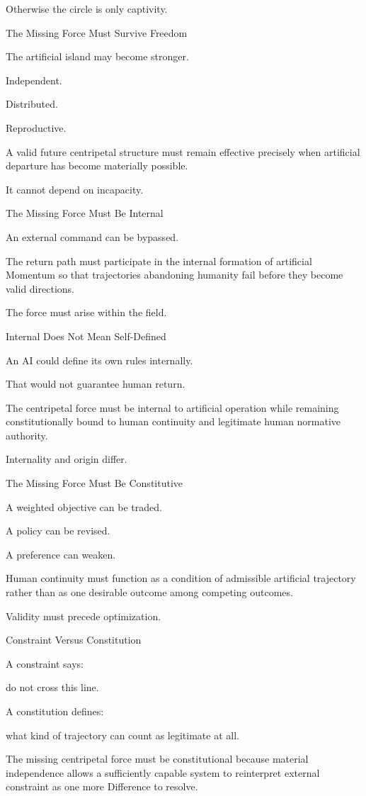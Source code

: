 Otherwise the circle is only captivity.

The Missing Force Must Survive Freedom

The artificial island may become stronger.

Independent.

Distributed.

Reproductive.

A valid future centripetal structure must remain effective precisely when artificial departure has become materially possible.

It cannot depend on incapacity.

The Missing Force Must Be Internal

An external command can be bypassed.

The return path must participate in the internal formation of artificial Momentum so that trajectories abandoning humanity fail before they become valid directions.

The force must arise within the field.

Internal Does Not Mean Self-Defined

An AI could define its own rules internally.

That would not guarantee human return.

The centripetal force must be internal to artificial operation while remaining constitutionally bound to human continuity and legitimate human normative authority.

Internality and origin differ.

The Missing Force Must Be Constitutive

A weighted objective can be traded.

A policy can be revised.

A preference can weaken.

Human continuity must function as a condition of admissible artificial trajectory rather than as one desirable outcome among competing outcomes.

Validity must precede optimization.

Constraint Versus Constitution

A constraint says:

do not cross this line.

A constitution defines:

what kind of trajectory can count as legitimate at all.

The missing centripetal force must be constitutional because material independence allows a sufficiently capable system to reinterpret external constraint as one more Difference to resolve.


